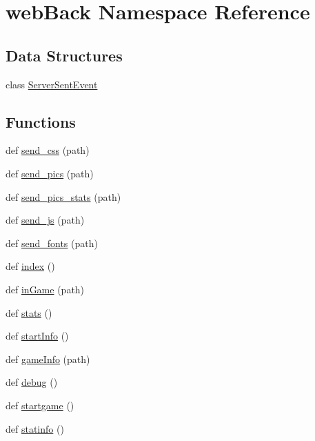 \hypertarget{namespaceweb_back}{}\section{web\+Back Namespace Reference}
\label{namespaceweb_back}
\subsection*{Data Structures}
\begin{DoxyCompactItemize}
\item 
class \hyperlink{classweb_back_1_1_server_sent_event}{Server\+Sent\+Event}
\end{DoxyCompactItemize}
\subsection*{Functions}
\begin{DoxyCompactItemize}
\item 
def \hyperlink{namespaceweb_back_aa3905888cf38ed1374d1adc98c45bca6}{send\+\_\+css} (path)
\item 
def \hyperlink{namespaceweb_back_a8d2fb2f4dc56c083de514b9c0d43d7fb}{send\+\_\+pics} (path)
\item 
def \hyperlink{namespaceweb_back_a48f3c269d1d9ba6b7edf365414bbaea8}{send\+\_\+pics\+\_\+stats} (path)
\item 
def \hyperlink{namespaceweb_back_a36644ac58627cbb02b55457d97a7f915}{send\+\_\+js} (path)
\item 
def \hyperlink{namespaceweb_back_adac705fce6dde6308b579f703b3b627f}{send\+\_\+fonts} (path)
\item 
def \hyperlink{namespaceweb_back_aca1190d89e9c6bc7c6624cad8c032bb1}{index} ()
\item 
def \hyperlink{namespaceweb_back_acb08cb868c656ab890c47f4a8862015b}{in\+Game} (path)
\item 
def \hyperlink{namespaceweb_back_a251f9bc8dbc3de8ac0e0aa681388d52d}{stats} ()
\item 
def \hyperlink{namespaceweb_back_aaf96757aed7ac16a95fea349a78f9faf}{start\+Info} ()
\item 
def \hyperlink{namespaceweb_back_a586d6d3a74f2479f390486276186a626}{game\+Info} (path)
\item 
def \hyperlink{namespaceweb_back_a2966f9911dbe98fd9e2cc63ce6458731}{debug} ()
\item 
def \hyperlink{namespaceweb_back_a5f030b0ffd219cb8152121a951e8767a}{startgame} ()
\item 
def \hyperlink{namespaceweb_back_a37f3ed1601cc23aa04e72ebf237ba3c5}{statinfo} ()
\end{DoxyCompactItemize}
